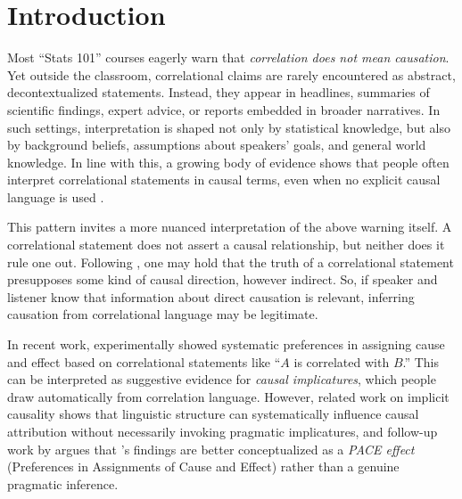 \documentclass[10pt,letterpaper]{article}
\begin{document}
\section{Introduction}

Most ``Stats 101'' courses eagerly warn that \textit{correlation does not mean causation}. 
Yet outside the classroom, correlational claims are rarely encountered as abstract, decontextualized statements. 
Instead, they appear in headlines, summaries of scientific findings, expert advice, or reports embedded in broader narratives. 
In such settings, interpretation is shaped not only by statistical knowledge, but also by background beliefs, assumptions about speakers’ goals, and general world knowledge. 
In line with this, a growing body of evidence shows that people often interpret correlational statements in causal terms, even when no explicit causal language is used \citep{adams2017readers,huff2023lie,seifert2022causal}.

This pattern invites a more nuanced interpretation of the above warning itself. 
A correlational statement does not assert a causal relationship, but neither does it rule one out. 
Following \citet{reichenbach1991direction}, one may hold that the truth of a correlational statement presupposes some kind of causal direction, however indirect. 
So, if speaker and listener know that information about direct causation is relevant, inferring causation from correlational language may be legitimate.

In recent work, \citet{gershman_causal_2023} experimentally showed systematic preferences in assigning cause and effect based on correlational statements like ``$A$ is correlated with $B$.''
This can be interpreted as suggestive evidence for \textit{causal implicatures}, which people draw automatically from correlation language.
However, related work on implicit causality shows that linguistic structure can systematically influence causal attribution \citep{hartshorne_what_2014,bott_verbs_2014} without necessarily invoking pragmatic implicatures, and follow-up work by \citet{lassiter2024rationality} argues that \citeauthor{gershman_causal_2023}'s findings are better conceptualized as a \emph{PACE effect} (Preferences in Assignments of Cause and Effect) rather than a genuine pragmatic inference.
\end{document}
